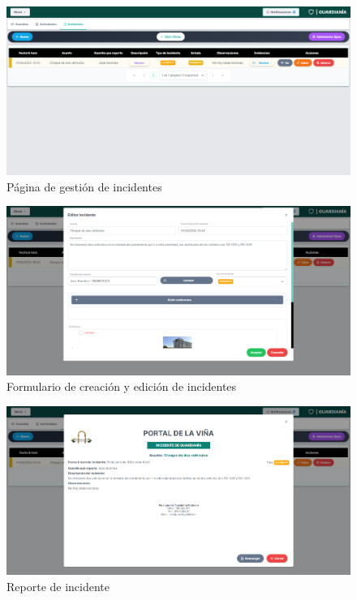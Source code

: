 \begin{figure}[H]
    \centering
    \includegraphics[width=1\textwidth]{resources/images/sw-guard-incidents}
    \caption{Página de gestión de incidentes}
    \label{fig:sw-guard-incidents}
\end{figure}

\begin{figure}[H]
    \centering
    \includegraphics[width=1\textwidth]{resources/images/sw-guard-incidents-form}
    \caption{Formulario de creación y edición de incidentes}
    \label{fig:sw-guard-incident-form}
\end{figure}

\begin{figure}[H]
    \centering
    \includegraphics[width=1\textwidth]{resources/images/sw-guard-incidents-report}
    \caption{Reporte de incidente}
    \label{fig:sw-guard-incidents-report}
\end{figure}

